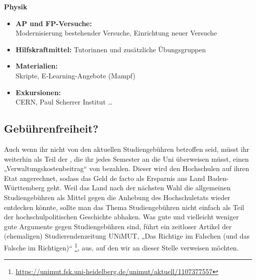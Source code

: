 \noindent\textbf{Physik}
\begin{itemize}
	\item \textbf{\gls{AP} und \gls{FP}-Versuche:}\\
	      Modernisierung bestehender Versuche, Einrichtung neuer Versuche
	\item \textbf{Hilfskraftmittel:}
	      Tutorinnen und zusätzliche Übungsgruppen
	\item \textbf{Materialien:}\\
	      Skripte, E-Learning-Angebote (Mampf)
	\item \textbf{Exkursionen:}\\
	      CERN, Paul Scherrer Institut \dots
\end{itemize}


\subsection{Gebührenfreiheit?}
Auch wenn ihr nicht von den aktuellen Studiengebühren betroffen seid, müsst ihr weiterhin als Teil der \EUR{\beitragssumme}, die ihr jedes Semester an die Uni überweisen müsst, einen „Verwaltungskostenbeitrag“ von \EUR{\verwaltungsbetrag} bezahlen. Dieser wird den Hochschulen auf ihren Etat angerechnet, sodass das Geld de facto als Ersparnis ans Land Baden-Württemberg geht. Weil das Land nach der nächsten Wahl die allgemeinen Studiengebühren als Mittel gegen die Anhebung des Hochschuletats wieder entdecken könnte, sollte man das Thema Studiengebühren nicht einfach als Teil der hochschulpolitischen Geschichte abhaken. Was gute und vielleicht weniger gute Argumente gegen Studiengebühren sind, führt ein zeitloser Artikel der (ehemaligen) Studierendenzeitung UNiMUT, „Das Richtige im Falschen (und das Falsche im Richtigen)“  \footnote{\url{https://unimut.fsk.uni-heidelberg.de/unimut/aktuell/1107377557}}, aus, auf den wir an dieser Stelle verweisen möchten.
